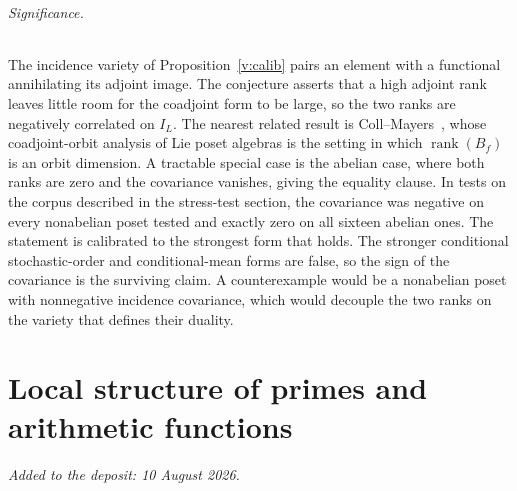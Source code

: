 \documentclass[11pt]{article}
\theoremstyle{definition}
\newcommand{\rank}{\operatorname{rank}}
\begin{document}
\paragraph{Significance.}
The incidence variety of Proposition~\ref{v:calib} pairs an element with a functional annihilating its adjoint image.  The conjecture asserts that a high adjoint rank leaves little room for the coadjoint form to be large, so the two ranks are negatively correlated on $I_L$.  The nearest related result is Coll--Mayers~\cite{CM}, whose coadjoint-orbit analysis of Lie poset algebras is the setting in which $\rank(B_f)$ is an orbit dimension.  A tractable special case is the abelian case, where both ranks are zero and the covariance vanishes, giving the equality clause.  In tests on the corpus described in the stress-test section, the covariance was negative on every nonabelian poset tested and exactly zero on all sixteen abelian ones.  The statement is calibrated to the strongest form that holds.  The stronger conditional stochastic-order and conditional-mean forms are false, so the sign of the covariance is the surviving claim.  A counterexample would be a nonabelian poset with nonnegative incidence covariance, which would decouple the two ranks on the variety that defines their duality.

\part{Local structure of primes and arithmetic functions}

\medskip\noindent\emph{Added to the deposit: 10 August 2026.}\par\medskip
\end{document}
